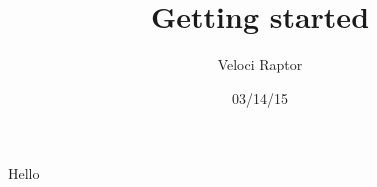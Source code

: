\documentclass{article}
\title{Getting started}
\author{Veloci Raptor}
\date{03/14/15}
\begin{document}
\maketitle

Hello
\end{document}
